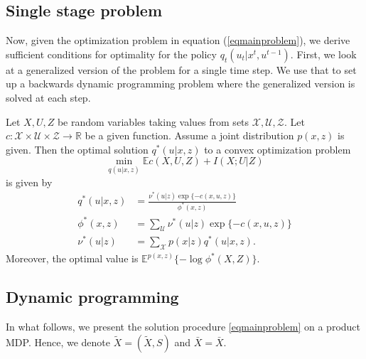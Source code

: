 \subsection{Single stage problem}
Now, given the optimization problem in equation (\ref{eqmainproblem}), we derive sufficient conditions for optimality for the policy $q_t(u_t|x^t,u^{t-1})$. First, we look at a generalized version of the problem for a single time step. We use that to set up a backwards dynamic programming problem where the generalized version is solved at each step.

\label{secsinglestage}
Let $X, U, Z$ be random variables taking values from sets $\mathcal{X}, \mathcal{U}, \mathcal{Z}$.
Let $c:\mathcal{X}\times \mathcal{U}\times \mathcal{Z}\rightarrow \mathbb{R}$ be a given function. 
Assume a joint distribution $p(x,z)$ is given.
Then the optimal solution $q^*(u|x, z)$ to a convex optimization problem
\[
\min_{q(u|x,z)} \mathbb{E}c(X,U,Z)+I(X;U|Z)
\]
is given by \cite{petersen2012robust}
\begin{align*}
q^*(u|x,z)&=\frac{\nu^*(u|z)\exp\{-c(x,u,z)\}}{\phi^*(x,z)} \\
\phi^*(x,z)&=\sum_{\mathcal{U}} \nu^*(u|z)\exp\{-c(x,u,z)\} \\
\nu^*(u|z)&=\sum_{\mathcal{X}} p(x|z)q^*(u|x,z).
\end{align*}
Moreover, the optimal value is $\mathbb{E}^{p(x,z)}\{-\log \phi^*(X,Z)\}$.

\subsection{Dynamic programming}
In what follows, we present the solution procedure \eqref{eqmainproblem} on a product MDP. Hence, we denote $\tilde{X} = (\tilde{X},S)$ and $\bar{X} = \bar{X}$. 

